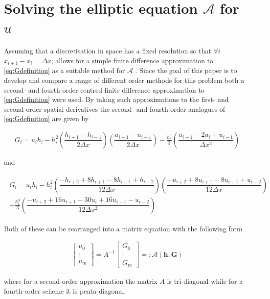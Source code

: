 \documentclass[SingleSpace,12pt]{Serre_ASCE}
\begin{document}
\section{Solving the elliptic equation $\mathcal{A}$ for $u$}
Assuming that a discretisation in space has a fixed resolution so that $\forall i$ $x_{i+1} - x_{i} = \Delta x$; allows for a simple finite difference approximation to \eqref{eq:Gdefinition} as a suitable method for $\mathcal{A}$ \cite{Hank-etal-2010-2034,Zoppou-2014}. Since the goal of this paper is to develop and compare a range of different order methods for this problem both a second- and fourth-order centred finite difference approximation to \eqref{eq:Gdefinition} were used. By taking such approximations to the first- and second-order spatial derivatives the second- and fourth-order analogues of \eqref{eq:Gdefinition} are given by
\begin{linenomath*}
\begin{gather}\label{eq:Gsecondord}
G_i = u_ih_i - h_i^2 \left(\dfrac{h_{i+1} - h_{i-1}}{2\Delta x}\right) \left(\dfrac{u_{i+1} - u_{i-1}}{2\Delta x}\right) - \frac{h_i^3}{3} \left(\dfrac{u_{i+1} - 2 u_{i} + u_{i-1}}{\Delta x^2}\right)
\end{gather}
\end{linenomath*}
and
\begin{linenomath*}
\begin{gather}
\begin{split}
G_i = u_ih_i - h_i^2 \left(\dfrac{-h_{i+2} + 8h_{i+1} - 8h_{i-1} + h_{i-2}}{12\Delta x}\right) \left(\dfrac{-u_{i+2} + 8u_{i+1} - 8u_{i-1} + u_{i-2}}{12\Delta x}\right) \\ - \frac{h_i^3}{3} \left(\dfrac{-u_{i+2} + 16u_{i+1} - 30u_{i} + 16u_{i-1} - u_{i-2}}{12\Delta x^2}\right).
\end{split}
\end{gather}
\label{eq:Gfourthord}
\end{linenomath*}
Both of these can be rearranged into a matrix equation with the following form 
\begin{linenomath*}
\begin{gather*}
\left[\begin{array}{c}
  u_0 \\
  \vdots \\
  u_m \end{array}\right] = A^{-1}
\left[\begin{array}{c}
 G_0 \\
 \vdots \\
 G_m \end{array}\right] =: \mathcal{A}(\boldsymbol{h},\boldsymbol{G})
\end{gather*}
\end{linenomath*}
where for a second-order approximation the matrix $A$ is tri-diagonal while for a fourth-order scheme it is penta-diagonal.
\end{document}
